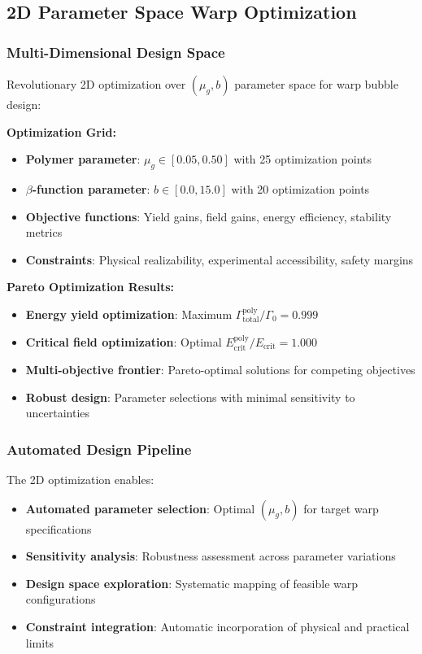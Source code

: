 \documentclass[11pt]{article}
\begin{document}
\subsection{2D Parameter Space Warp Optimization}

\subsubsection{Multi-Dimensional Design Space}
Revolutionary 2D optimization over $(\mu_g, b)$ parameter space for warp bubble design:

\textbf{Optimization Grid:}
\begin{itemize}
    \item \textbf{Polymer parameter}: $\mu_g \in [0.05, 0.50]$ with 25 optimization points
    \item \textbf{$\beta$-function parameter}: $b \in [0.0, 15.0]$ with 20 optimization points
    \item \textbf{Objective functions}: Yield gains, field gains, energy efficiency, stability metrics
    \item \textbf{Constraints}: Physical realizability, experimental accessibility, safety margins
\end{itemize}

\textbf{Pareto Optimization Results:}
\begin{itemize}
    \item \textbf{Energy yield optimization}: Maximum $\Gamma_{\text{total}}^{\text{poly}}/\Gamma_0 = 0.999$
    \item \textbf{Critical field optimization}: Optimal $E_{\text{crit}}^{\text{poly}}/E_{\text{crit}} = 1.000$
    \item \textbf{Multi-objective frontier}: Pareto-optimal solutions for competing objectives
    \item \textbf{Robust design}: Parameter selections with minimal sensitivity to uncertainties
\end{itemize}

\subsubsection{Automated Design Pipeline}
The 2D optimization enables:
\begin{itemize}
    \item \textbf{Automated parameter selection}: Optimal $(\mu_g, b)$ for target warp specifications
    \item \textbf{Sensitivity analysis}: Robustness assessment across parameter variations
    \item \textbf{Design space exploration}: Systematic mapping of feasible warp configurations
    \item \textbf{Constraint integration}: Automatic incorporation of physical and practical limits
\end{itemize}
\end{document}
